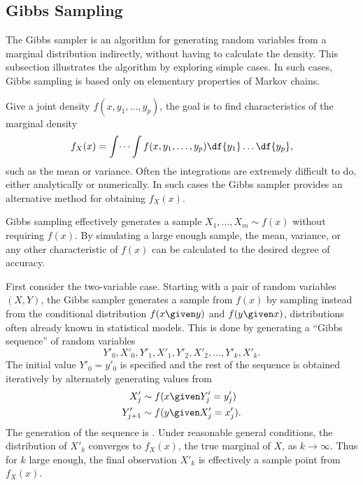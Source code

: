 \documentclass[12pt]{article}
\begin{document}
\subsection*{Gibbs Sampling}

The Gibbs sampler is an algorithm for generating random variables from a
marginal distribution indirectly, without having to calculate the
density. This subsection illustrates the algorithm by exploring simple
cases.  In such cases, Gibbs sampling is based only on elementary
properties of Markov chains.

Give a joint density \( f(x, y_1, \dots, y_p) \),%
the goal is to find characteristics of the marginal density%
\[
    f_{X}(x) = \int \dots \int f(x, y_1, \dots, y_p) \df{y_1} \dots \df{y_p},
\] such as the mean or variance. Often the integrations are extremely
difficult to do, either analytically or numerically.  In such cases the
Gibbs sampler provides an alternative method for obtaining \( f_X(x) \).

Gibbs sampling%
effectively generates a sample \( X_1, \dots, X_m \sim f(x) \) without
requiring \( f(x) \).  By simulating a large enough sample, the mean,
variance, or any other characteristic of \( f(x) \) can be calculated to
the desired degree of accuracy.

First consider the two-variable case.  Starting with a pair of random
variables \( (X, Y) \), the Gibbs sampler generates a sample from \( f(x)
\) by sampling instead from the conditional distribution \( f(x \given
y) \) and \( f(y \given x) \), distributions often already known in
statistical models.  This is done by generating a ``Gibbs sequence''%
of random variables
\begin{equation}
    Y'_0, X'_0, Y'_1, X'_1, Y'_2, X'_2, \dots, Y'_k, X'_k.%
    \label{eq:applicationsmetropolis:gibbsseq}
\end{equation}
The initial value \( Y'_0 = y'_0 \) is specified and the rest of the
sequence is obtained iteratively by alternately generating values from
\begin{align*}
    X'_j &\sim f(x \given Y'_j = y'_j) \\
    Y'_{j+1} &\sim f(y \given X'_j = x'_j).  \\
\end{align*}
The generation of the sequence is .%
Under reasonable general conditions, the distribution of \( X'_k \)
converges to \( f_X(x) \), the true marginal of \( X \), as \( k \to
\infty \).  Thus for \( k \) large enough, the final observation \( X'_k
\) is effectively a sample point from \( f_X(x) \).
\end{document}
